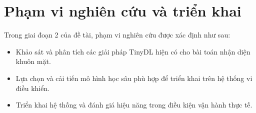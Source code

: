 \section{Phạm vi nghiên cứu và triển khai}
Trong giai đoạn 2 của đề tài, phạm vi nghiên cứu được xác định như sau:

\begin{itemize}
    \item Khảo sát và phân tích các giải pháp TinyDL hiện có cho bài toán nhận diện khuôn mặt.
    \item Lựa chọn và cải tiến mô hình học sâu phù hợp để triển khai trên hệ thống vi điều khiển.
    \item Triển khai hệ thống và đánh giá hiệu năng trong điều kiện vận hành thực tế.
\end{itemize}

